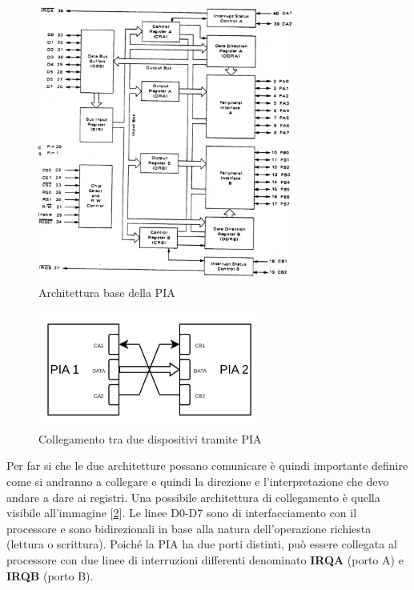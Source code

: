 \begin{figure}
    \centering
    \includegraphics[width=0.75\textwidth]{img/PIA-SCHEME.jpg}
    \caption{Architettura base della PIA}\label{img:PIA}
\end{figure}

\begin{figure}
    \centering
    \includegraphics[width=0.65\textwidth]{img/PIA-CON.png}
    \caption{Collegamento tra due dispositivi tramite PIA}\label{img:PIA-CON}
\end{figure}

Per far si che le due architetture possano comunicare è quindi importante definire come si andranno a collegare e quindi la direzione e l'interpretazione che devo andare a dare ai registri. Una possibile architettura di collegamento è quella visibile all'immagine [\ref{img:PIA-CON}].
Le linee D0-D7 sono di interfacciamento con il processore e sono bidirezionali in base alla natura dell'operazione richiesta (lettura o scrittura). 
Poiché la PIA ha due porti distinti, può essere collegata al processore con due linee di interruzioni differenti denominato \textbf{IRQA} (porto A) e \textbf{IRQB} (porto B).  

